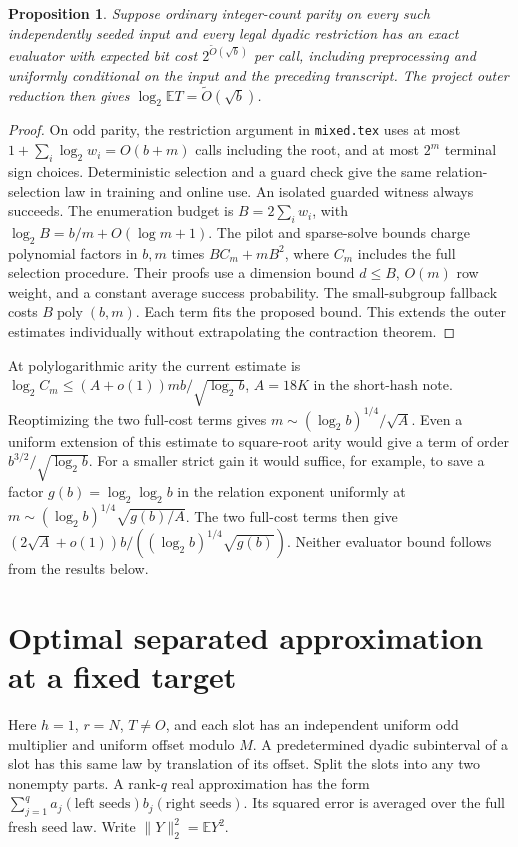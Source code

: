 \documentclass[11pt]{article}
\newtheorem{proposition}{Proposition}
\newcommand{\E}{\mathbb E}
\begin{document}
\begin{proposition}
Suppose ordinary integer-count parity on every such independently
seeded input and every legal dyadic restriction has an exact evaluator
with expected bit cost $2^{\widetilde O(\sqrt b)}$ per call,
including preprocessing and uniformly conditional on the input and
the preceding transcript. The project outer reduction then gives
$\log_2\E T=\widetilde O(\sqrt b)$.
\end{proposition}
\begin{proof}
On odd parity, the restriction argument in \texttt{mixed.tex}
uses at most $1+\sum_i\log_2 w_i=O(b+m)$ calls including the root,
and at most $2^m$ terminal sign choices. Deterministic selection and a
guard check give the same relation-selection law in training and online
use. An isolated guarded witness always succeeds. The enumeration
budget is $B=2\sum_i w_i$, with $\log_2 B=b/m+O(\log m+1)$.
The pilot and sparse-solve bounds charge polynomial factors in $b,m$
times $B C_m+mB^2$, where $C_m$ includes the full selection procedure.
Their proofs use a dimension bound $d\le B$, $O(m)$ row weight, and a
constant average success probability. The small-subgroup fallback costs
$B\operatorname{poly}(b,m)$. Each term fits the proposed bound. This
extends the outer estimates individually without extrapolating the
contraction theorem.
\end{proof}
At polylogarithmic arity the current estimate is
$\log_2 C_m\le(A+o(1))mb/\sqrt{\log_2b}$, $A=18K$ in the short-hash
note. Reoptimizing the two full-cost terms gives
$m\sim(\log_2 b)^{1/4}/\sqrt A$. Even a uniform extension of this
estimate to square-root arity would give a term of order
$b^{3/2}/\sqrt{\log_2 b}$. For a smaller strict gain it would suffice,
for example, to save a factor $g(b)=\log_2\log_2 b$ in the relation
exponent uniformly at $m\sim(\log_2 b)^{1/4}\sqrt{g(b)/A}$. The two
full-cost terms then give $(2\sqrt A+o(1))b/((\log_2 b)^{1/4}\sqrt{g(b)})$.
Neither evaluator bound follows from the results below.

\section{Optimal separated approximation at a fixed target}
Here $h=1$, $r=N$, $T\ne O$, and each slot has an independent uniform
odd multiplier and uniform offset modulo $M$. A predetermined dyadic
subinterval of a slot has this same law by translation of its offset.
Split the slots into any two nonempty parts. A rank-$q$ real
approximation has the form $\sum_{j=1}^q a_j(\text{left seeds})
b_j(\text{right seeds})$. Its squared error is averaged over the full
fresh seed law. Write $\|Y\|_2^2=\E Y^2$.
\end{document}
